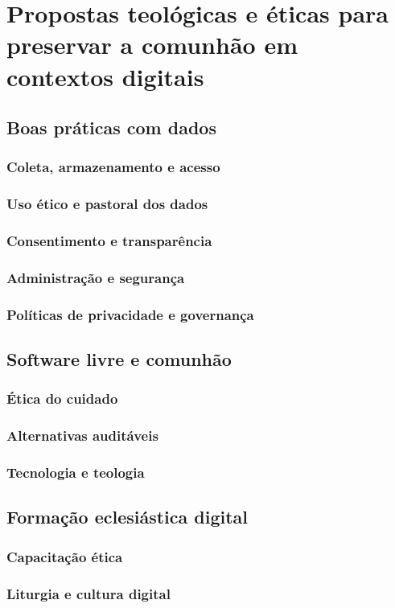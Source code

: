 \newpage
\chapter{Propostas teológicas e éticas para preservar a comunhão em contextos digitais}

\section{Boas práticas com dados}
\subsection{Coleta, armazenamento e acesso}

\subsection{Uso ético e pastoral dos dados}

\subsection{Consentimento e transparência}

\subsection{Administração e segurança}

\subsection{Políticas de privacidade e governança}

\section{Software livre e comunhão}
\subsection{Ética do cuidado}

\subsection{Alternativas auditáveis}

\subsection{Tecnologia e teologia}

\section{Formação eclesiástica digital}
\subsection{Capacitação ética}

\subsection{Liturgia e cultura digital}
